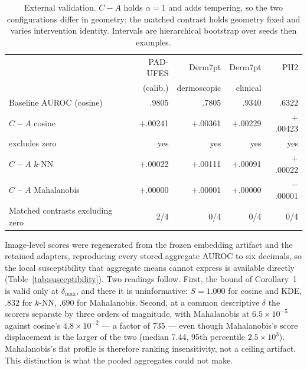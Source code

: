 \documentclass[11pt,a4paper]{article}
\begin{document}
\begin{table}[t]
\centering
\caption{External validation. $C-A$ holds $\alpha=1$ and adds tempering, so the two configurations differ in geometry; the matched contrast holds geometry fixed and varies intervention identity. Intervals are hierarchical bootstrap over seeds then examples.}
\label{tab:external}
\small
\begin{tabular}{lrrrr}
\toprule
& PAD-UFES & Derm7pt & Derm7pt & PH2\\
& (calib.) & dermoscopic & clinical & \\
\midrule
Baseline AUROC (cosine) & .9805 & .7805 & .9340 & .6322\\
\midrule
$C-A$ cosine & $+$.00241 & $+$.00361 & $+$.00229 & $+$.00423\\
\quad excludes zero & yes & yes & yes & yes\\
$C-A$ $k$-NN & $+$.00022 & $+$.00111 & $+$.00091 & $+$.00022\\
$C-A$ Mahalanobis & $+$.00000 & $+$.00001 & $+$.00000 & $-$.00001\\
\midrule
Matched contrasts excluding zero & 2/4 & 0/4 & 0/4 & 0/4\\
\bottomrule
\end{tabular}
\end{table}

Image-level scores were regenerated from the frozen embedding artifact and the retained adapters, reproducing every stored aggregate AUROC to six decimals, so the local susceptibility that aggregate means cannot express is available directly (Table~\ref{tab:susceptibility}). Two readings follow. First, the bound of Corollary~1 is valid only at $\delta_{\max}$, and there it is uninformative: $S=1.000$ for cosine and KDE, $.832$ for $k$-NN, $.690$ for Mahalanobis. Second, at a common descriptive $\delta$ the scorers separate by three orders of magnitude, with Mahalanobis at $6.5\times10^{-5}$ against cosine's $4.8\times10^{-2}$ --- a factor of 735 --- even though Mahalanobis's score displacement is the larger of the two (median 7.44, 95th percentile $2.5\times10^{3}$). Mahalanobis's flat profile is therefore ranking insensitivity, not a ceiling artifact. This distinction is what the pooled aggregates could not make.
\end{document}
